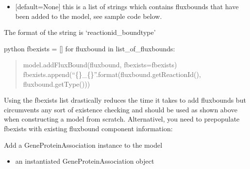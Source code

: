 \documentclass[letterpaper,10pt,english]{sphinxmanual}
\begin{document}
\begin{fulllineitems}
\begin{fulllineitems}
\begin{itemize}
\item {} 
\sphinxAtStartPar
{} {[}default=None{]} this is a list of strings which contains fluxbounds that have been added to the model, see sample code below.

\end{itemize}

\sphinxAtStartPar
The format of the string is ‘reactionid\_boundtype’

\sphinxAtStartPar
{\color{red}\bfseries{}\textasciigrave{}\textasciigrave{}}{\color{red}\bfseries{}\textasciigrave{}}python
fbexists = {[}{]}
for fluxbound in list\_of\_fluxbounds:
\begin{quote}

\sphinxAtStartPar
model.addFluxBound(fluxbound, fbexists=fbexists)
fbexists.append(“\{\}\_\{\}”.format(fluxbound.getReactionId(), fluxbound.getType()))
\end{quote}

\sphinxAtStartPar
{\color{red}\bfseries{}\textasciigrave{}\textasciigrave{}}{\color{red}\bfseries{}\textasciigrave{}}

\sphinxAtStartPar
Using the fbexists list drastically reduces the time it takes to add fluxbounds but circumvents any sort of existence checking and should  be
used as shown above when constructing a model from scratch. Alternativel, you need to prepopulate fbexists with existing fluxbound component information:

\sphinxAtStartPar
{}

\end{fulllineitems}


\begin{fulllineitems}
\label{\detokenize{modules_doc:cbmpy.CBModel.Model.addGPRAssociation}}
\pysigstartsignatures
{}
\pysigstopsignatures
\sphinxAtStartPar
Add a GeneProteinAssociation instance to the model
\begin{itemize}
\item {} 
\sphinxAtStartPar
{} an instantiated GeneProteinAssociation object


\end{itemize}
\end{fulllineitems}
\end{fulllineitems}
\end{document}
